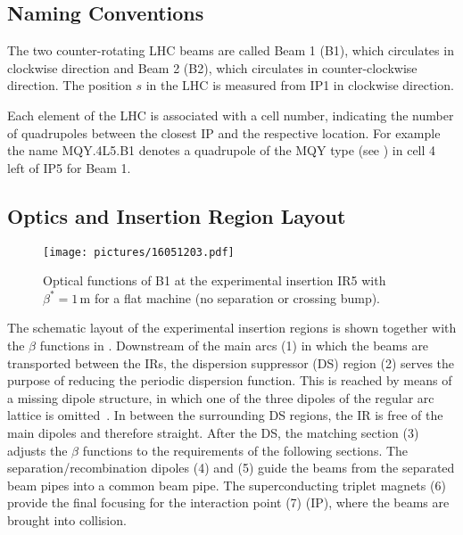 \subsection{Naming Conventions}

The two counter-rotating LHC beams are called Beam 1 (B1), which circulates in clockwise direction and Beam 2 (B2), which circulates in counter-clockwise direction. The position $s$ in the LHC is measured from IP1 in clockwise direction. 

Each element of the LHC is associated with a cell number, indicating the number of quadrupoles between the closest IP and the respective location. For example the name MQY.4L5.B1 denotes a quadrupole of the MQY type (see \cite{CERN-2004-003-V1}) in cell 4 left of IP5 for Beam 1. 



\subsection{Optics and Insertion Region Layout}



%
\begin{figure}[b]  
    \centering
    \texttt{[image: pictures/16051203.pdf]}
    \caption{Optical functions of B1 at the experimental insertion IR5 with $\beta^*=1\,$m for a flat machine (no separation or crossing bump).}  
    \label{pic:16051202}
\end{figure}
%
The schematic layout of the experimental insertion regions is shown together with the $\beta$ functions in . Downstream of the main arcs (1) in which the beams are transported between the IRs, the dispersion suppressor (DS) region (2) serves the purpose of reducing the periodic dispersion function. This is reached by means of a missing dipole structure, in which one of the three dipoles of the regular arc lattice is omitted~\citedr. In between the surrounding DS regions, the IR is free of the main dipoles and therefore straight. After the DS, the matching section (3) adjusts the $\beta$ functions to the requirements of the following sections. The separation/recombination dipoles (4) and (5) guide the beams from the separated beam pipes into a common beam pipe. The superconducting triplet magnets (6) provide the final focusing for the  interaction point (7) (IP), where the beams are brought into collision.

